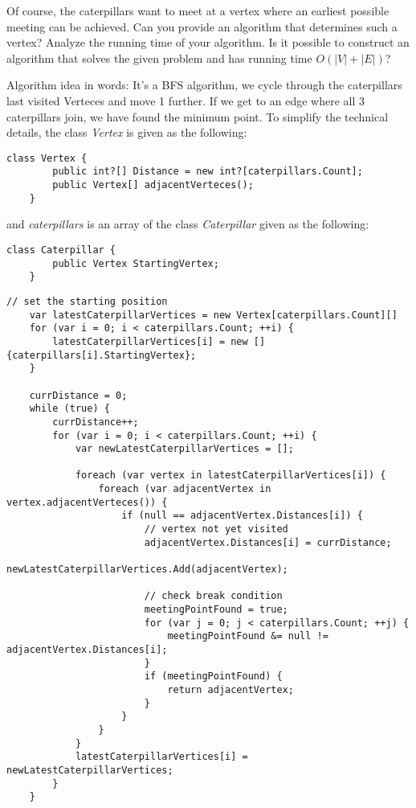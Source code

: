 \documentclass[12pt, a4]{article}
\begin{document}
 Of course, the caterpillars want to meet at a vertex where an earliest possible meeting can be achieved. Can you provide an algorithm that determines such a vertex?  Analyze the running time of your algorithm. Is it possible to construct an algorithm that solves the given problem and has running time $O(|V|+|E|)$?
 

 Algorithm idea in words:
 It's a BFS algorithm, we cycle through the caterpillars last visited Verteces and move 1 further. If we get to an edge where all 3 caterpillars join, we have found the minimum point. To simplify the technical details, the class \emph{Vertex} is given as the following:
 \begin{lstlisting}[language={[Sharp]c}] 		
 	class Vertex {
 		public int?[] Distance = new int?[caterpillars.Count];
 		public Vertex[] adjacentVerteces();
 	}
 \end{lstlisting}
and \emph{caterpillars} is an array of the class \emph{Caterpillar} given as the following:
 \begin{lstlisting}[language={[Sharp]c}] 		
	class Caterpillar {
		public Vertex StartingVertex;
	}
\end{lstlisting}

 
 \pagebreak
 \begin{lstlisting}[language={[Sharp]c}] 		
 	// set the starting position
	var latestCaterpillarVertices = new Vertex[caterpillars.Count][]
 	for (var i = 0; i < caterpillars.Count; ++i) {
 		latestCaterpillarVertices[i] = new [] {caterpillars[i].StartingVertex};
 	}
 	
 	currDistance = 0;
	while (true) {
 		currDistance++;
	 	for (var i = 0; i < caterpillars.Count; ++i) {
	 		var newLatestCaterpillarVertices = [];
	 		
			foreach (var vertex in latestCaterpillarVertices[i]) {
				foreach (var adjacentVertex in vertex.adjacentVerteces()) {
					if (null == adjacentVertex.Distances[i]) {
						// vertex not yet visited
						adjacentVertex.Distances[i] = currDistance;
						newLatestCaterpillarVertices.Add(adjacentVertex);
						
						// check break condition
						meetingPointFound = true;
						for (var j = 0; j < caterpillars.Count; ++j) {
							meetingPointFound &= null != adjacentVertex.Distances[i];						
						}
						if (meetingPointFound) {
							return adjacentVertex;
						}
					}
				}
			}
			latestCaterpillarVertices[i] = newLatestCaterpillarVertices;
		}
	}
 \end{lstlisting}
\end{document}
